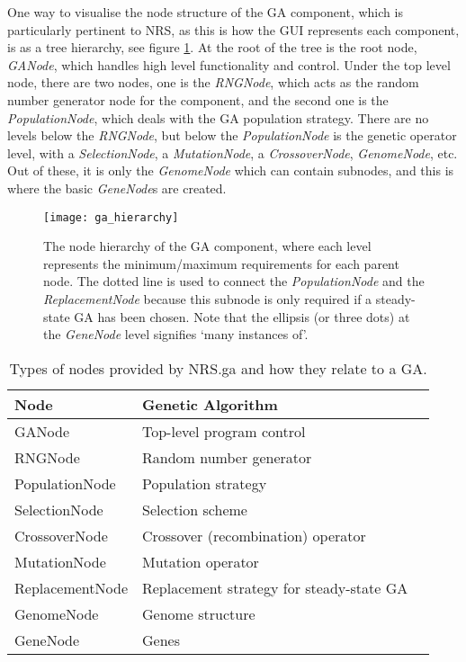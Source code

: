 \documentclass[10pt, notitlepage, a4paper]{article}
\begin{document}
One way to visualise the node structure of the GA component, which is particularly pertinent to NRS, as this is how the GUI represents each component, is as a tree hierarchy, see figure \ref{hierarchy}. At the root of the tree is the root node, {\it GANode}, which handles high level functionality and control. Under the top level node, there are two nodes, one is the {\it RNGNode}, which acts as the random number generator node for the component, and the second one is the {\it PopulationNode}, which deals with the GA population strategy. There are no levels below the {\it RNGNode}, but below the {\it PopulationNode} is the genetic operator level, with a {\it SelectionNode}, a {\it MutationNode}, a {\it CrossoverNode}, {\it GenomeNode}, etc. Out of these, it is only the {\it GenomeNode} which can contain subnodes, and this is where the basic {\it GeneNode}s are created.

\begin{figure}[ht]
\begin{center}
\texttt{[image: ga\_hierarchy]}\\
\end{center}
\caption{The node hierarchy of the GA component, where each level represents the minimum/maximum requirements for each parent node. The dotted line is used to connect the {\it PopulationNode} and the {\it ReplacementNode} because this subnode is only required if a steady-state GA has been chosen. Note that the ellipsis (or three dots) at the {\it GeneNode} level signifies `many instances of'.}
\label{hierarchy}
\end{figure}

\begin{table}[!ht]
\begin{center}
\caption{Types of nodes provided by NRS.ga and how they relate to a GA.}
\label{nodes}
\begin{tabular}{|l|l|l|}
\hline {\bf Node} & {\bf Genetic Algorithm}\\\hline
\hline GANode & Top-level program control\\
\hline RNGNode & Random number generator\\
\hline PopulationNode & Population strategy\\
\hline SelectionNode & Selection scheme\\
\hline CrossoverNode & Crossover (recombination) operator\\
\hline MutationNode & Mutation operator\\
\hline ReplacementNode & Replacement strategy for steady-state GA\\
\hline GenomeNode & Genome structure\\
\hline GeneNode & Genes\\
\hline
\end{tabular}
\end{center}
\end{table}
\end{document}

